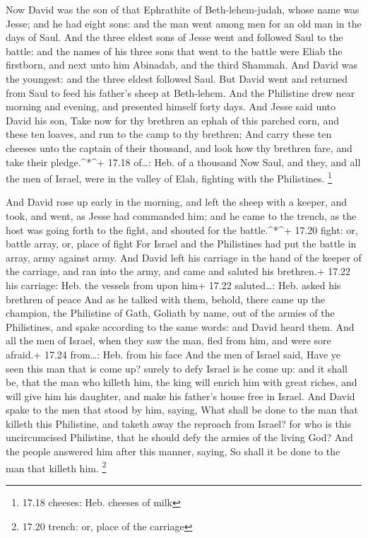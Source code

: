  Now David was the son of that Ephrathite of
Beth-lehem-judah, whose name was Jesse; and he had eight sons: and the
man went among men for an old man in the days of Saul.  And
the three eldest sons of Jesse went and followed Saul to the battle: and
the names of his three sons that went to the battle were Eliab the
firstborn, and next unto him Abinadab, and the third Shammah.
 And David was the youngest: and the three eldest followed
Saul.  But David went and returned from Saul to feed his
father's sheep at Beth-lehem.  And the Philistine drew near
morning and evening, and presented himself forty days.  And
Jesse said unto David his son, Take now for thy brethren an ephah of
this parched corn, and these ten loaves, and run to the camp to thy
brethren;  And carry these ten cheeses unto the captain of
their thousand, and look how thy brethren fare, and take their
pledge.\^{}*\^{}+ 17.18 of\ldots: Heb. of a thousand  Now
Saul, and they, and all the men of Israel, were in the valley of Elah,
fighting with the Philistines. \footnote{17.18 cheeses: Heb. cheeses of
  milk}

 And David rose up early in the morning, and left the sheep
with a keeper, and took, and went, as Jesse had commanded him; and he
came to the trench, as the host was going forth to the fight, and
shouted for the battle.\^{}*\^{}+ 17.20 fight: or, battle array, or,
place of fight  For Israel and the Philistines had put the
battle in array, army against army.  And David left his
carriage in the hand of the keeper of the carriage, and ran into the
army, and came and saluted his brethren.+ 17.22 his carriage: Heb. the
vessels from upon him+ 17.22 saluted\ldots: Heb. asked his brethren of
peace  And as he talked with them, behold, there came up
the champion, the Philistine of Gath, Goliath by name, out of the armies
of the Philistines, and spake according to the same words: and David
heard them.  And all the men of Israel, when they saw the
man, fled from him, and were sore afraid.+ 17.24 from\ldots: Heb. from
his face  And the men of Israel said, Have ye seen this man
that is come up? surely to defy Israel is he come up: and it shall be,
that the man who killeth him, the king will enrich him with great
riches, and will give him his daughter, and make his father's house free
in Israel.  And David spake to the men that stood by him,
saying, What shall be done to the man that killeth this Philistine, and
taketh away the reproach from Israel? for who is this uncircumcised
Philistine, that he should defy the armies of the living God?
 And the people answered him after this manner, saying, So
shall it be done to the man that killeth him. \footnote{17.20 trench:
  or, place of the carriage}

